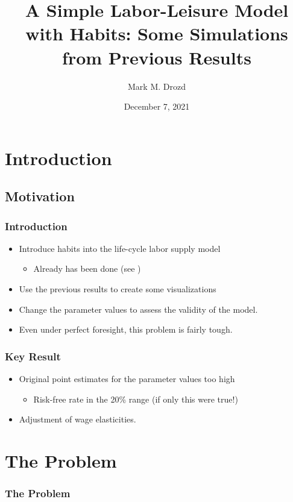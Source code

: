 \documentclass[pdflatex]{beamer}
\title[Project MMD]{A Simple Labor-Leisure Model with Habits: Some Simulations from Previous Results}
\author[Drozd]{Mark M. Drozd}
\institute[JHU]{Johns Hopkins University}
\date[\today]{December 7, 2021}
\begin{document}


\begin{frame}[plain]
  \titlepage
\end{frame}


\section{Introduction}
\subsection{Motivation}

\begin{frame}
\frametitle{Introduction}

\begin{itemize}
\item Introduce habits into the life-cycle labor supply model
  \begin{itemize}
  \item Already has been done (see \cite{bover1991relaxing})
  \end{itemize}
\item Use the previous results to create some visualizations
  \item Change the parameter values to assess the validity of the model. 
\item Even under perfect foresight, this problem is fairly tough.
  \end{itemize}
\end{frame}

\begin{frame}
  \frametitle{Key Result}
\begin{itemize}
\item Original point estimates for the parameter values too high
  \begin{itemize}
  \item Risk-free rate in the 20\% range (if only this were true!)
  \end{itemize}
 \item Adjustment of wage elasticities.
\end{itemize}
\end{frame}

\section{The Problem}
\begin{frame}
\frametitle{The Problem}
\end{frame}
\end{document}
